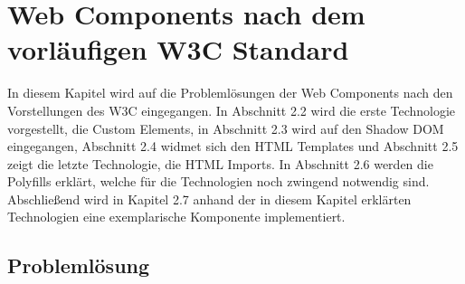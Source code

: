 \chapter{Web Components nach dem vorläufigen W3C Standard}\label{web-components-nach-w3c}

In diesem Kapitel wird auf die Problemlösungen der Web Components nach den Vorstellungen des W3C eingegangen. In Abschnitt 2.2 wird die erste Technologie vorgestellt, die Custom Elements, in Abschnitt 2.3 wird auf den Shadow DOM eingegangen, Abschnitt 2.4 widmet sich den HTML Templates und Abschnitt 2.5 zeigt die letzte Technologie, die HTML Imports. In Abschnitt 2.6 werden die Polyfills erklärt, welche für die Technologien noch zwingend notwendig sind. Abschließend wird in Kapitel 2.7 anhand der in diesem Kapitel erklärten Technologien eine exemplarische Komponente implementiert.


\section{Problemlösung}\label{problemloesung}

